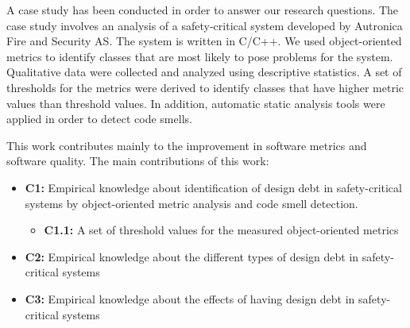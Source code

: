 A case study has been conducted in order to answer our research questions. The case study involves an analysis of a safety-critical system developed by Autronica Fire and Security AS. The system is written in C/C++. We used object-oriented metrics to identify classes that are most likely to pose problems for the system. Qualitative data were collected and analyzed using descriptive statistics. A set of thresholds for the metrics were derived to identify classes that have higher metric values than threshold values. In addition, automatic static analysis tools were applied in order to detect code smells. 

This work contributes mainly to the improvement in software metrics and software quality. The main contributions of this work:
\begin{itemize}
\setlength\itemsep{-1em}
\item \textbf{C1:} Empirical knowledge about identification of design debt in safety-critical systems by object-oriented metric analysis and code smell detection.
\begin{itemize}
\item \textbf{C1.1:} A set of threshold values for the measured object-oriented metrics
\end{itemize}
\item \textbf{C2:} Empirical knowledge about the different types of design debt in safety-critical systems
\item \textbf{C3:} Empirical knowledge about the effects of having design debt in safety-critical systems
\end{itemize}